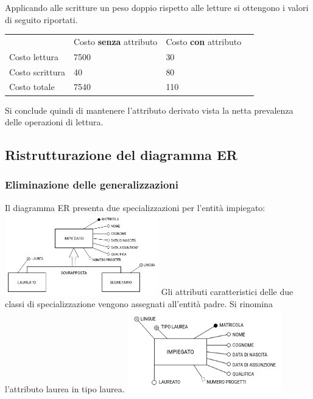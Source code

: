 \documentclass{article}
\begin{document}
Applicando alle scritture un peso doppio rispetto alle letture si ottengono i valori di seguito riportati.
\begin{table}[H]
\renewcommand{\arraystretch}{1.2}
\centering
\begin{tabular}{|p{}|l|l|l|}
\cline{1-3}
& Costo \textbf{senza} attributo & Costo \textbf{con} attributo \\ \cline{1-3}
Costo lettura & 7500 & 30 \\ \cline{1-3}
Costo scrittura & 40 & 80 \\ \cline{1-3}
Costo totale & 7540 & 110 \\ \cline{1-3}
\end{tabular}
\end{table}
Si conclude quindi di mantenere l'attributo derivato vista la netta prevalenza delle operazioni di lettura.
\newpage

\subsection{Ristrutturazione del diagramma ER}

\subsubsection{Eliminazione delle generalizzazioni}
Il diagramma ER presenta due specializzazioni per l'entità impiegato:
\newline
\newline
\includegraphics[width=0.5\textwidth]{er_R1.png}
\newline
\newline
Gli attributi caratteristici delle due classi di specializzazione vengono assegnati all'entità padre.
\newline
Si rinomina l'attributo laurea in tipo laurea.
\newline
\newline
\includegraphics[width=0.5\textwidth]{er_R2.png}
\end{document}

